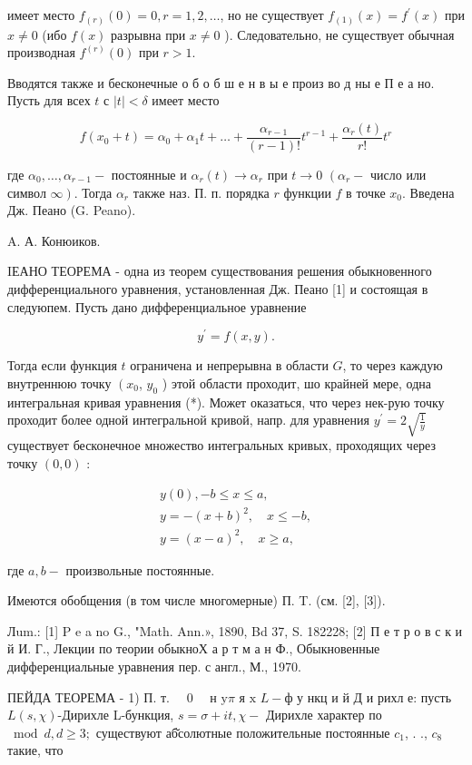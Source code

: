 \documentclass[10pt]{article}
\begin{document}
имеет место $f_{(r)}(0)=0, r=1,2, \ldots$, но не существует $f_{(1)}(x)=f^{\prime}(x)$ при $x \neq 0$ (ибо $f(x)$ разрывна при $x \neq 0$ ). Следовательно, не существует обычная производная $f^{(r)}(0)$ при $r>1$.

Вводятся также и бесконечные о б о б ш е н в ы $е$ произ во д ны е П е а но. Пусть для всех $t$ с $|t|<\delta$ имеет место

\[
f\left(x_{0}+t\right)=\alpha_{0}+\alpha_{1} t+\ldots+\frac{\alpha_{r-1}}{(r-1) !} t^{r-1}+\frac{\alpha_{r}(t)}{r !} t^{r}
\]

где $\alpha_{0}, \ldots, \alpha_{r-1}-$ постоянные и $\alpha_{r}(t) \rightarrow \alpha_{r}$ при $t \rightarrow 0$ $\left(\alpha_{r}-\right.$ число или символ $\left.\infty\right)$. Тогда $\alpha_{r}$ также наз. П. п. порядка $r$ функции $f$ в точке $x_{0}$. Введена Дж. Пеано (G. Peano).

A. А. Конюиков.

IЕАНО ТЕОРЕМА - одна из теорем существования решения обыкновенного дифференциального уравнения, установленная Дж. Пеано [1] и состоящая в следуюпем. Пусть дано дифференциальное уравнение

\[
y^{\prime}=f(x, y) .
\]

Тогда если функция $t$ ограничена и непрерывна в области $G$, то через каждую внутреннюю точку $\left(x_{0}\right.$, $y_{0}$ ) этой области проходит, шо крайней мере, одна интегральная кривая уравнения (*). Может оказаться, что через нек-рую точку проходит более одной интегральной кривой, напр. для уравнения $y^{\prime}=2 \sqrt{\frac{1}{y}}$ существует бесконечное множество интегральных кривых, проходящих через точку $(0,0)$ :

\[
\begin{gathered}
y(0),-b \leqslant x \leqslant a, \\
y=-(x+b)^{2}, \quad x \leqslant-b, \\
y=(x-a)^{2}, \quad x \geqslant a,
\end{gathered}
\]

где $a, b-$ произвольные постоянные.

Имеются обобщения (в том числе многомерные) П. T. (см. [2], [3]).

Лum.: [1] P e a no G., "Math. Ann.», 1890, Bd 37, S. 182228; [2] П е т р о в с к и й И. Г., Лекции по теории обыкноХ а р т м а н Ф., Обыкновенные дифференциальные уравнения пер. с англ., М., 1970.

ПЕЙДА ТЕОРЕМА - 1) П. т. $\quad 0 \quad$ н $\mathrm{y} \pi$ я $\mathrm{x}$ $L-ф$ у нкц и й Д и рихл е: пусть $L(s, \chi)$-Дирихле L-бункция, $s=\sigma+i t, \chi-$ Дирихле характер по $\bmod d, d \geqslant 3 ;$ существуют аб̆солютные положительные постоянные $c_{1}$, . ., $c_{8}$ такие, что
\end{document}
